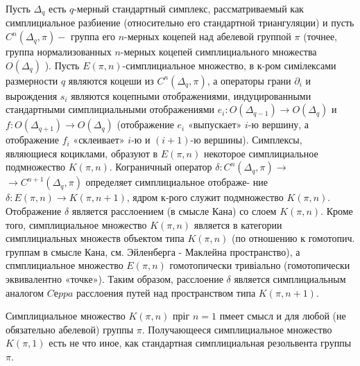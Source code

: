 \documentclass[10pt]{article}
\begin{document}
Пусть $\Delta_{q}$ есть $q$-мерный стандартный симплекс, рассматриваемый как симплициальное разбиение (относительно его стандартной триангуляции) и пусть $C^{n}\left(\Delta_{q}, \pi\right)-$ группа его $n$-мерных коцепей над абелевой группой $\pi$ (точнее, группа нормализованных $n$-мерных коцепей симплициального множества $O\left(\Delta_{q}\right)$ ). Пусть $E(\pi, n)$-симплициальное множество, в к-ром симілексами размерности $q$ являются коцеши из $C^{n}\left(\Delta_{q}, \pi\right)$, а операторы грани $\partial_{i}$ и вырождения $s_{i}$ являются коцепными отображениями, индуцированными стандартными симплициальными отображениями $e_{i}: O\left(\Delta_{q-1}\right) \rightarrow O\left(\Delta_{q}\right)$ и $f: O\left(\Delta_{q+1}\right) \rightarrow O\left(\Delta_{q}\right)$ (отображение $e_{i}$ «выпускает» $i$-ю вершину, а отображение $f_{i}$ «склеивает» $i$-ю и $(i+1)$-ю вершины). Симплексы, являющиеся коциклами, образуют в $E(\pi, n)$ некоторое симплициальное подмножество $K(\pi, n)$. Кограничный оператор $\delta: C^{n}\left(\Delta_{q}, \pi\right) \rightarrow$ $\rightarrow C^{n+1}\left(\Delta_{q}, \pi\right)$ определяет симплициальное отображе- ние $\delta: E(\pi, n) \rightarrow K(\pi, n+1)$, ядром к-рого служит подмножество $K(\pi, n)$. Отображение $\delta$ является расслоением (в смысле Кана) со слоем $K(\pi, n)$. Кроме того, симплициальное множество $K(\pi, n)$ является в категории симплициальных множеств объектом типа $K(\pi, n)$ (по отношению к гомотопич. группам в смысле Кана, см. Эйленберга - Маклейна пространство), а спмплициальное множество $E(\pi, n)$ гомотопически тривіально (гомотопически эквивалентно «точке»). Таким образом, расслоение $\delta$ является симплициальным аналогом $C е p p a$ расслоения путей над пространством типа $K(\pi, n+1)$.



Симплициальное множество $K(\pi, n)$ пріг $n=1$ пмеет смысл и для любой (не обязательно абелевой) группы $\pi$. Получающееся симплициальное множество $K(\pi, 1)$ есть не что иное, как стандартная симплициальная резольвента группы $\pi$.
\end{document}
